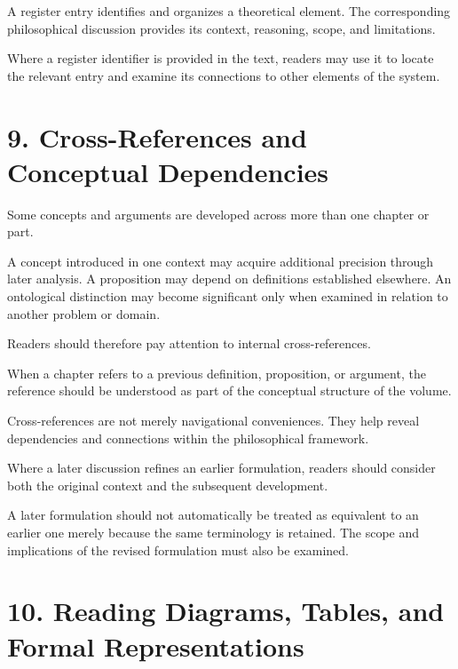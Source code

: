 A register entry identifies and organizes
a theoretical element. The corresponding
philosophical discussion provides its
context, reasoning, scope, and limitations.

Where a register identifier is provided
in the text, readers may use it to locate
the relevant entry and examine its
connections to other elements of
the system.


\section*{9. Cross-References and Conceptual Dependencies}

Some concepts and arguments are developed
across more than one chapter or part.

A concept introduced in one context may
acquire additional precision through later
analysis. A proposition may depend on
definitions established elsewhere. An
ontological distinction may become significant
only when examined in relation to another
problem or domain.

Readers should therefore pay attention
to internal cross-references.

When a chapter refers to a previous
definition, proposition, or argument,
the reference should be understood
as part of the conceptual structure
of the volume.

Cross-references are not merely
navigational conveniences. They help
reveal dependencies and connections
within the philosophical framework.

Where a later discussion refines an
earlier formulation, readers should
consider both the original context
and the subsequent development.

A later formulation should not automatically
be treated as equivalent to an earlier
one merely because the same terminology
is retained. The scope and implications
of the revised formulation must also
be examined.


\section*{10. Reading Diagrams, Tables, and Formal
Representations}

